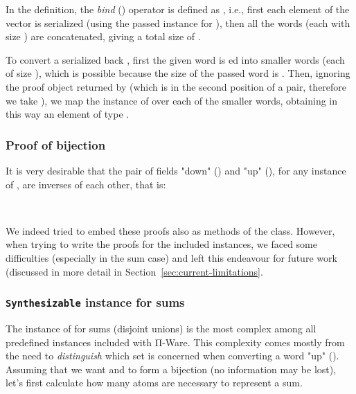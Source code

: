             In the  definition,
            the \emph{bind} (\AF{>>=}) operator is defined as   , i.e.,
            first each element of the vector is serialized (using the passed instance for ),
            then all the words (each with size ) are concatenated, giving a total size of
            \AY{(} \AF{*} \AY{)}.

            To convert a serialized  back , first the given word is ed
            into  smaller words (each of size ), which is possible because the size of
            the passed word is \AY{(} \AF{*} \AY{)}.
            Then, ignoring the proof object returned by  (which is in the second position
            of a pair, therefore we take ), we map the  instance of  over
            each of the smaller words, obtaining in this way an element of type
              .

            \subsubsection{Proof of bijection}
            It is very desirable that the pair of fields "down" () and "up" (),
            for any instance of , are inverses of each other, that is:

            \begin{center}
                 \AY{(} \AY{:} \AY{)}   \AY{(} \AY{)}  
                \\
                 \AY{(} \AY{:}  \AY{)}   \AY{(} \AY{)}  
            \end{center}

            We indeed tried to embed these proofs also as methods of the  class.
            However, when trying to write the proofs for the included instances,
            we faced some difficulties (especially in the sum case) and left this endeavour for future work
            (discussed in more detail in Section~\ref{sec:current-limitations}.

            \subsubsection{\texttt{Synthesizable} instance for sums}
            The instance of  for sums (disjoint unions) is the most complex among all predefined
            instances included with Π-Ware.
            This complexity comes mostly from the need to \emph{distinguish} which set is concerned
            when converting a word "up" ().
            Assuming that we want  and  to form a bijection (no information may be lost),
            let's first calculate how many atoms are necessary to represent a sum.

